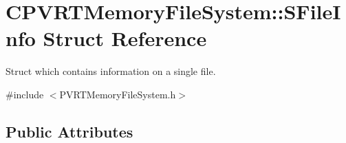 \hypertarget{struct_c_p_v_r_t_memory_file_system_1_1_s_file_info}{\section{C\+P\+V\+R\+T\+Memory\+File\+System\+:\+:S\+File\+Info Struct Reference}
\label{struct_c_p_v_r_t_memory_file_system_1_1_s_file_info}
}


Struct which contains information on a single file.  




{\ttfamily \#include $<$P\+V\+R\+T\+Memory\+File\+System.\+h$>$}

\subsection*{Public Attributes}

